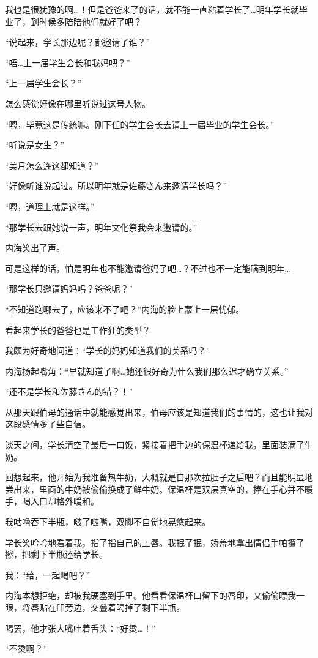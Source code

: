 我也是很犹豫的啊…！但是爸爸来了的话，就不能一直粘着学长了…明年学长就毕业了，到时候多陪陪他们就好了吧？

“说起来，学长那边呢？都邀请了谁？”

“唔…上一届学生会长和我妈吧？”

“上一届学生会长？”

怎么感觉好像在哪里听说过这号人物。

“嗯，毕竟这是传统嘛。刚下任的学生会长去请上一届毕业的学生会长。”

“听说是女生？”

“美月怎么连这都知道？”

“好像听谁说起过。所以明年就是佐藤さん来邀请学长吗？”

“嗯，道理上就是这样。”

“那学长去跟她说一声，明年文化祭我会来邀请的。”

内海笑出了声。

可是这样的话，怕是明年也不能邀请爸妈了吧…？不过也不一定能瞒到明年…

“那学长只邀请妈妈吗？爸爸呢？”

“不知道跑哪去了，应该来不了吧？”内海的脸上蒙上一层忧郁。

看起来学长的爸爸也是工作狂的类型？

我颇为好奇地问道：“学长的妈妈知道我们的关系吗？”

内海扬起嘴角：“早就知道了啊…她还很好奇为什么我们那么迟才确立关系。”

“还不是学长和佐藤さん的错？！”

从那天跟伯母的通话中就能感觉出来，伯母应该是知道我们的事情的，这也让我对这段感情多了些自信。

谈天之间，学长清空了最后一口饭，紧接着把手边的保温杯递给我，里面装满了牛奶。

回想起来，他开始为我准备热牛奶，大概就是自那次拉肚子之后吧？而且能明显地尝出来，里面的牛奶被偷偷换成了鲜牛奶。保温杯是双层真空的，捧在手心并不暖手，喝入口却格外暖和。

我咕噜吞下半瓶，啵了啵嘴，双脚不自觉地晃悠起来。

学长笑吟吟地看着我，指了指自己的上唇。我抿了抿，娇羞地拿出情侣手帕擦了擦，把剩下半瓶还给学长。

我：“给，一起喝吧？”

内海本想拒绝，却被我硬塞到手里。他看看保温杯口留下的唇印，又偷偷瞟我一眼，将唇贴在印旁边，交叠着喝掉了剩下半瓶。

喝罢，他才张大嘴吐着舌头：“好烫…！”

“不烫啊？”

